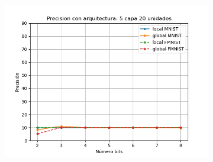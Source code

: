 \begin{figure}[H]
\begin{subfigure}[H]{0.45\textwidth}
    \includegraphics[width=\textwidth]{imagenes/dni/Precision con arquitectura: 5 capa 20 unidades.png} 
    \end{subfigure}
\end{figure}